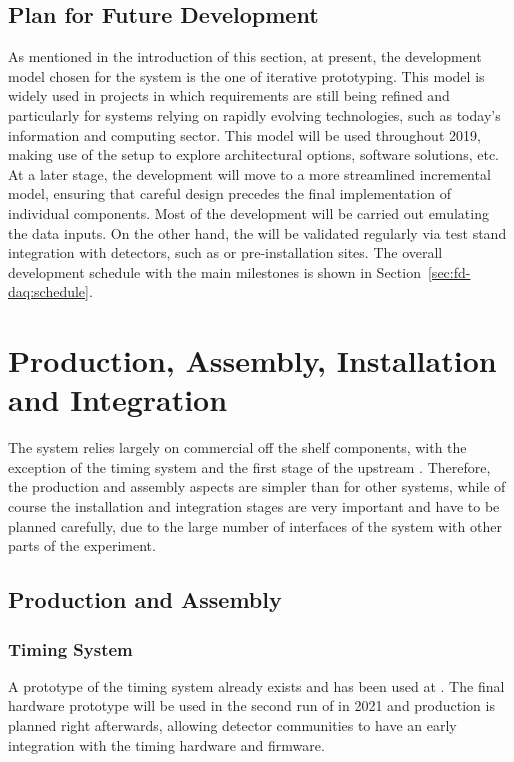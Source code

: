 \subsection{Plan for Future Development}
\label{sec:sp-daq:design-plans}

As mentioned in the introduction of this section, at present, the development model chosen for the  system is the one of iterative prototyping.
This model is widely used in projects in which requirements are still
being refined and particularly for systems relying on rapidly evolving technologies, such as today's information and computing sector. 
This model will be used throughout 2019, making use of the  setup to explore architectural options, software solutions, etc.
At a later stage, the  development will move to a more streamlined incremental model, ensuring that careful design precedes the final implementation of individual components.
Most of the development will be carried out emulating the data inputs.
On the other hand, the  will be validated regularly via test stand integration with detectors, such as  or pre-installation sites.
The overall development schedule with the main  milestones is shown in Section~\ref{sec:fd-daq:schedule}.

\section{Production, Assembly, Installation and Integration}
\label{sec:sp-daq:production}

The  system relies largely on commercial off the shelf components, with the exception of the timing system and the first stage of the upstream .
Therefore, the production and assembly aspects are simpler than for other systems, while of course the installation and integration stages are very important and have to be planned carefully, due to the large number of interfaces of the  system with other parts of the experiment.

\subsection{Production and Assembly}
\subsubsection{Timing System}
A prototype of the timing system already exists and has been used at . The final hardware prototype will be used in the second run of  in 2021 and production is planned right afterwards, allowing detector communities to have an early integration with the timing hardware and firmware.

